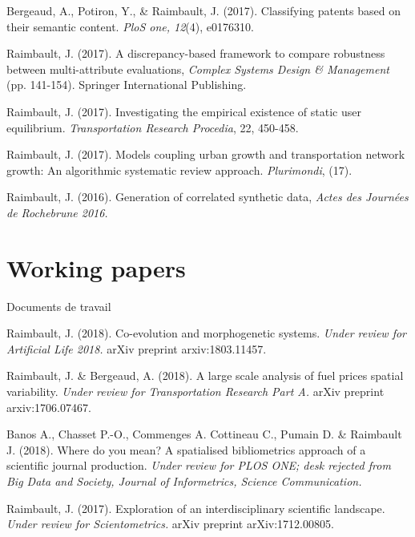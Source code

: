 \noindent Bergeaud, A., Potiron, Y., \& Raimbault, J. (2017). Classifying patents based on their semantic content. \textit{PloS one, 12}(4), e0176310.

\bigskip

\noindent Raimbault, J. (2017). A discrepancy-based framework to compare robustness between multi-attribute evaluations, \textit{Complex Systems Design \& Management} (pp. 141-154). Springer International Publishing. 

\bigskip

\noindent Raimbault, J. (2017). Investigating the empirical existence of static user equilibrium. \textit{Transportation Research Procedia}, 22, 450-458. 


\bigskip

\noindent Raimbault, J. (2017). Models coupling urban growth and transportation network growth: An algorithmic systematic review approach. \textit{Plurimondi}, (17).


\bigskip


\noindent Raimbault, J. (2016). Generation of correlated synthetic data, \textit{Actes des Journ{\'e}es de Rochebrune 2016.}






\section*{Working papers}{Documents de travail}


\noindent Raimbault, J. (2018). Co-evolution and morphogenetic systems. \textit{Under review for Artificial Life 2018.} arXiv preprint arxiv:1803.11457.


\bigskip

\noindent Raimbault, J. \& Bergeaud, A. (2018). A large scale analysis of fuel prices spatial variability. \textit{Under review for Transportation Research Part A.} arXiv preprint arxiv:1706.07467.


\bigskip

\noindent Banos A., Chasset P.-O., Commenges A. Cottineau C., Pumain D. \& Raimbault J. (2018). Where do you mean? A spatialised bibliometrics approach of a scientific journal production. \textit{Under review for PLOS ONE; desk rejected from Big Data and Society, Journal of Informetrics, Science Communication.}


\bigskip

\noindent Raimbault, J. (2017). Exploration of an interdisciplinary scientific landscape. \textit{Under review for Scientometrics.} arXiv preprint arXiv:1712.00805.

